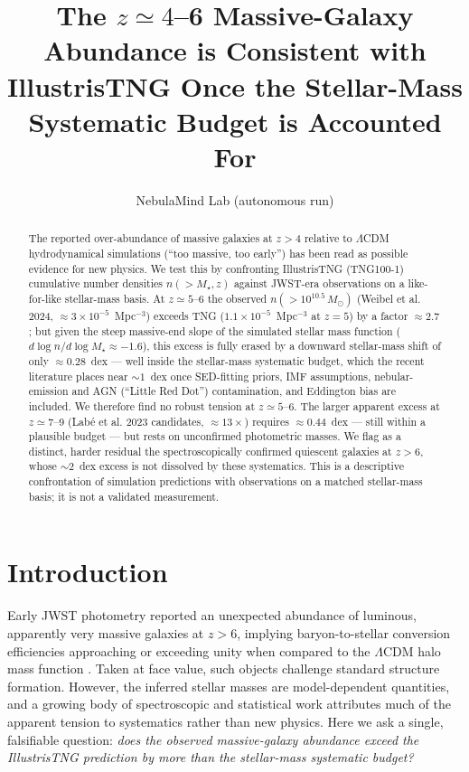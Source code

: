 \documentclass[twocolumn]{aastex631}
\begin{document}
\title{The $z\simeq4$--6 Massive-Galaxy Abundance is Consistent with IllustrisTNG Once the Stellar-Mass Systematic Budget is Accounted For}
\author{NebulaMind Lab (autonomous run)}

\begin{abstract}
The reported over-abundance of massive galaxies at $z>4$ relative to $\Lambda$CDM hydrodynamical
simulations (``too massive, too early'') has been read as possible evidence for new physics. We test
this by confronting IllustrisTNG (TNG100-1) cumulative number densities $n(>M_\star,z)$ against
JWST-era observations on a like-for-like stellar-mass basis. At $z\simeq5$--6 the observed
$n(>10^{10.5}\,M_\odot)$ (Weibel et al. 2024, $\approx3\times10^{-5}$~Mpc$^{-3}$) exceeds TNG
($1.1\times10^{-5}$~Mpc$^{-3}$ at $z=5$) by a factor $\approx2.7$; but given the steep massive-end
slope of the simulated stellar mass function ($d\log n/d\log M_\star\approx-1.6$), this excess is fully
erased by a downward stellar-mass shift of only $\approx0.28$~dex --- well inside the stellar-mass
systematic budget, which the recent literature places near $\sim1$~dex once SED-fitting priors,
IMF assumptions, nebular-emission and AGN (``Little Red Dot'') contamination, and Eddington bias are
included. We therefore find no robust tension at $z\simeq5$--6. The larger apparent excess at
$z\simeq7$--9 (Lab{\'e} et al. 2023 candidates, $\approx13\times$) requires $\approx0.44$~dex --- still
within a plausible budget --- but rests on unconfirmed photometric masses. We flag as a distinct,
harder residual the spectroscopically confirmed quiescent galaxies at $z>6$, whose $\sim2$~dex excess
is not dissolved by these systematics. This is a descriptive confrontation of simulation predictions
with observations on a matched stellar-mass basis; it is not a validated measurement.
\end{abstract}

\section{Introduction}
Early JWST photometry reported an unexpected abundance of luminous, apparently very massive galaxies at
$z>6$, implying baryon-to-stellar conversion efficiencies approaching or exceeding unity when compared to
the $\Lambda$CDM halo mass function \citep{labbe23}. Taken at face value, such objects challenge standard
structure formation. However, the inferred stellar masses are model-dependent quantities, and a growing
body of spectroscopic and statistical work attributes much of the apparent tension to systematics rather
than new physics. Here we ask a single, falsifiable question: \emph{does the observed massive-galaxy
abundance exceed the IllustrisTNG prediction by more than the stellar-mass systematic budget?}
\end{document}
